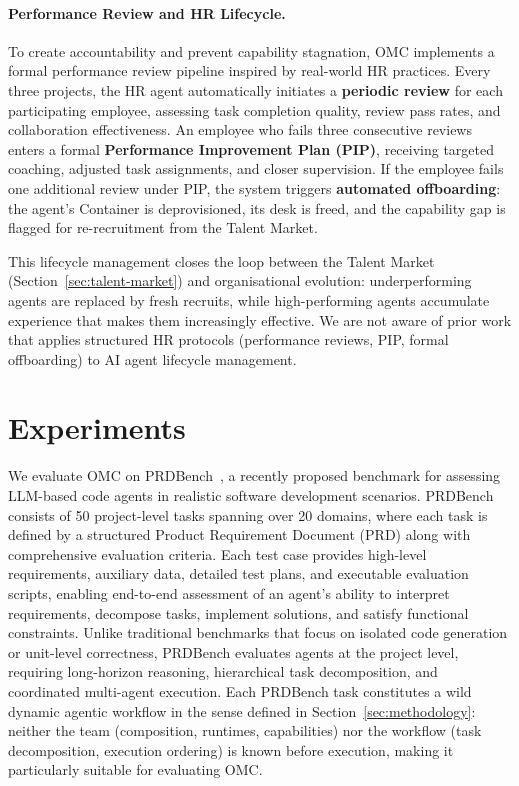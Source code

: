 \documentclass[11pt,a4paper]{article}
\begin{document}
\paragraph{Performance Review and HR Lifecycle.} To create accountability and prevent capability stagnation, OMC implements a formal performance review pipeline inspired by real-world HR practices.  Every three projects, the HR agent automatically initiates a \textbf{periodic review} for each participating employee, assessing task completion quality, review pass rates, and collaboration effectiveness.  An employee who fails three consecutive reviews enters a formal \textbf{Performance Improvement Plan (PIP)}, receiving targeted coaching, adjusted task assignments, and closer supervision.  If the employee fails one additional review under PIP, the system triggers \textbf{automated offboarding}: the agent's Container is deprovisioned, its desk is freed, and the capability gap is flagged for re-recruitment from the Talent Market.

This lifecycle management closes the loop between the Talent Market (Section~\ref{sec:talent-market}) and organisational evolution: underperforming agents are replaced by fresh recruits, while high-performing agents accumulate experience that makes them increasingly effective.  We are not aware of prior work that applies structured HR protocols (performance reviews, PIP, formal offboarding) to AI agent lifecycle management.


\section{Experiments}
\label{sec:experiments}

We evaluate OMC on PRDBench~\cite{fu2025prdbench}, a recently proposed benchmark for assessing LLM-based code agents in realistic software development scenarios.  PRDBench consists of 50 project-level tasks spanning over 20 domains, where each task is defined by a structured Product Requirement Document (PRD) along with comprehensive evaluation criteria.  Each test case provides high-level requirements, auxiliary data, detailed test plans, and executable evaluation scripts, enabling end-to-end assessment of an agent’s ability to interpret requirements, decompose tasks, implement solutions, and satisfy functional constraints.  Unlike traditional benchmarks that focus on isolated code generation or unit-level correctness, PRDBench evaluates agents at the project level, requiring long-horizon reasoning, hierarchical task decomposition, and coordinated multi-agent execution. Each PRDBench task constitutes a wild dynamic agentic workflow in the sense defined in Section~\ref{sec:methodology}: neither the team (composition, runtimes, capabilities) nor the workflow (task decomposition, execution ordering) is known before execution, making it particularly suitable for evaluating OMC.
\end{document}
